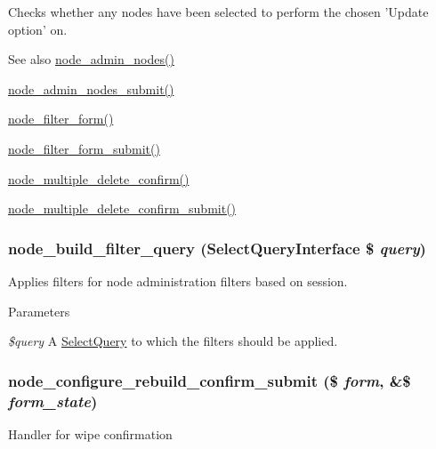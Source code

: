 Checks whether any nodes have been selected to perform the chosen 'Update option' on.

\begin{DoxySeeAlso}{See also}
\hyperlink{group__forms_ga3fb56c702a3c16eddd2fcd8ccd3e4adb}{node\_\-admin\_\-nodes()} 

\hyperlink{node_8admin_8inc_a5f159cfed0d6cce65d5d70747efec391}{node\_\-admin\_\-nodes\_\-submit()} 

\hyperlink{group__forms_ga2b7edb82b488db11ffde4fa60958004d}{node\_\-filter\_\-form()} 

\hyperlink{node_8admin_8inc_a346f00ebb9b4aae36025623d893c5061}{node\_\-filter\_\-form\_\-submit()} 

\hyperlink{group__forms_ga25cc06a5aa3aa17eadc5a8a97e7c5e9e}{node\_\-multiple\_\-delete\_\-confirm()} 

\hyperlink{node_8admin_8inc_ab8a2e11edeef2797ca739f94d1eb1af9}{node\_\-multiple\_\-delete\_\-confirm\_\-submit()} 
\end{DoxySeeAlso}
\hypertarget{node_8admin_8inc_a2bbebf8ee912c5658a7a22a744d47da0}{
\subsubsection[{node\_\-build\_\-filter\_\-query}]{\setlength{\rightskip}{0pt plus 5cm}node\_\-build\_\-filter\_\-query ({\bf SelectQueryInterface} \$ {\em query})}}
\label{node_8admin_8inc_a2bbebf8ee912c5658a7a22a744d47da0}
Applies filters for node administration filters based on session.


\begin{DoxyParams}{Parameters}
\item[{\em \$query}]A \hyperlink{classSelectQuery}{SelectQuery} to which the filters should be applied. \end{DoxyParams}
\hypertarget{node_8admin_8inc_a81b709fbced4062b5c58137a9255fab4}{
\subsubsection[{node\_\-configure\_\-rebuild\_\-confirm\_\-submit}]{\setlength{\rightskip}{0pt plus 5cm}node\_\-configure\_\-rebuild\_\-confirm\_\-submit (\$ {\em form}, \/  \&\$ {\em form\_\-state})}}
\label{node_8admin_8inc_a81b709fbced4062b5c58137a9255fab4}
Handler for wipe confirmation

